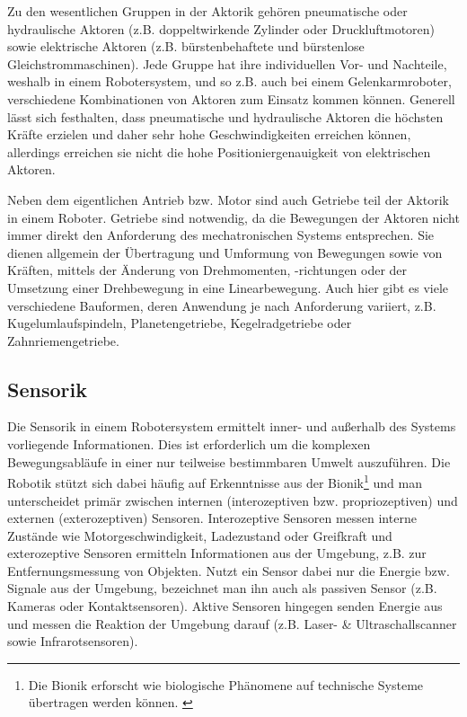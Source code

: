 \documentclass[11pt,ngerman,parskip=half]{scrartcl}
\begin{document}
Zu den wesentlichen Gruppen in der Aktorik gehören pneumatische oder
hydraulische Aktoren (z.B. doppeltwirkende Zylinder oder Druckluftmotoren)
sowie elektrische Aktoren (z.B. bürstenbehaftete und bürstenlose
Gleichstrommaschinen). Jede Gruppe hat ihre individuellen Vor- und Nachteile,
weshalb in einem Robotersystem, und so z.B. auch bei einem Gelenkarmroboter,
verschiedene Kombinationen von Aktoren zum Einsatz kommen können. Generell
lässt sich festhalten, dass pneumatische und hydraulische Aktoren die
höchsten Kräfte erzielen und daher sehr hohe Geschwindigkeiten erreichen
können, allerdings erreichen sie nicht die hohe Positioniergenauigkeit von
elektrischen Aktoren.
\parencite[vgl.][63--79]{hesse_taschenbuch_2016}

Neben dem eigentlichen Antrieb bzw. Motor sind auch Getriebe teil der Aktorik
in einem Roboter. Getriebe sind notwendig, da die Bewegungen der Aktoren
nicht immer direkt den Anforderung des mechatronischen Systems entsprechen.
Sie dienen allgemein der Übertragung und Umformung von Bewegungen sowie von
Kräften, mittels der Änderung von Drehmomenten, -richtungen oder der
Umsetzung einer Drehbewegung in eine Linearbewegung. Auch hier gibt es viele
verschiedene Bauformen, deren Anwendung je nach Anforderung variiert, z.B.
Kugelumlaufspindeln, Planetengetriebe, Kegelradgetriebe oder Zahnriemengetriebe.
\parencites[vgl.][121\psq]{maccloy_robotertechnik:_1989}
[][89--96]{hesse_taschenbuch_2016}

\subsection{Sensorik}
\label{subsec:Sensorik}
Die Sensorik in einem Robotersystem ermittelt inner- und außerhalb des
Systems vorliegende Informationen. Dies ist erforderlich um die komplexen
Bewegungsabläufe in einer nur teilweise bestimmbaren Umwelt auszuführen. Die
Robotik stützt sich dabei häufig auf Erkenntnisse aus der Bionik\footnote{
Die Bionik erforscht wie biologische Phänomene auf technische Systeme
übertragen werden können. \parencite{feess_definition:_2018}} und man
unterscheidet primär zwischen internen (interozeptiven bzw. propriozeptiven)
und externen (exterozeptiven) Sensoren. Interozeptive Sensoren messen interne
Zustände wie Motorgeschwindigkeit, Ladezustand oder Greifkraft und
exterozeptive Sensoren ermitteln Informationen aus der Umgebung, z.B. zur
Entfernungsmessung von Objekten. Nutzt ein Sensor dabei nur die Energie bzw.
Signale aus der Umgebung, bezeichnet man ihn auch als passiven Sensor (z.B.
Kameras oder Kontaktsensoren). Aktive Sensoren hingegen senden Energie aus
und messen die Reaktion der Umgebung darauf (z.B. Laser- \&
Ultraschallscanner sowie Infrarotsensoren).
\parencites[vgl.][23\psq]{hertzberg_mobile_2012}[][73]
{kruse_mehrobjekt-zustandsschatzung_2013}[][97]{hesse_taschenbuch_2016}
\end{document}

